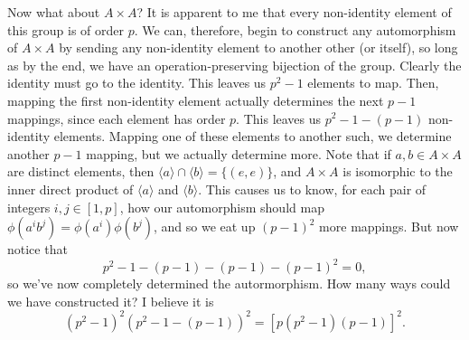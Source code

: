 \documentclass[12pt]{article}
\begin{document}
Now what about $A\times A$?  It is apparent to me that every non-identity element of this group is
of order $p$.  We can, therefore, begin to construct any automorphism of $A\times A$ by sending
any non-identity element to another other (or itself), so long as by the end, we have an operation-preserving
bijection of the group.  Clearly the identity must go to the identity.  This leaves us $p^2-1$ elements to map.
Then, mapping the first non-identity element actually determines the next $p-1$ mappings, since each
element has order $p$.  This leaves us $p^2-1-(p-1)$ non-identity elements.  Mapping one of these
elements to another such, we determine another $p-1$ mapping, but we actually determine more.
Note that if $a,b\in A\times A$ are distinct elements, then $\langle a\rangle\cap\langle b\rangle=\{(e,e)\}$,
and $A\times A$ is isomorphic to the inner direct product of $\langle a\rangle$ and $\langle b\rangle$.  This causes us
to know, for each pair of integers $i,j\in[1,p]$, how our automorphism should map $\phi(a^ib^j)=\phi(a^i)\phi(b^j)$, and so we eat up
$(p-1)^2$ more mappings.  But now notice that
\begin{equation*}
p^2-1-(p-1)-(p-1)-(p-1)^2 = 0,
\end{equation*}
so we've now completely determined the autormorphism.  How many ways could we have constructed it?
I believe it is
\begin{equation*}
(p^2-1)^2(p^2-1-(p-1))^2 = [p(p^2-1)(p-1)]^2.
\end{equation*}
\end{document}
